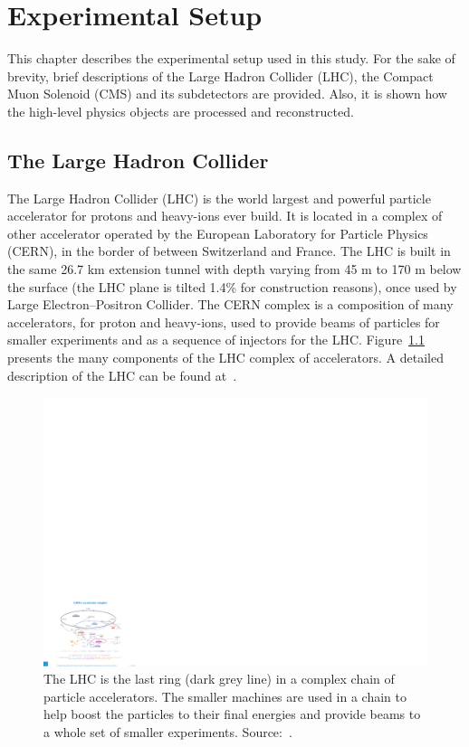 
\chapter{Experimental Setup}

This chapter describes the experimental setup used in this study.  For the sake of brevity, brief descriptions of the Large Hadron Collider (LHC), the Compact Muon Solenoid (CMS) and its  subdetectors are provided. Also, it is shown how  the high-level physics objects are processed and reconstructed.

\section{The Large Hadron Collider}

The Large Hadron Collider (LHC) is the world largest and powerful particle accelerator for protons and heavy-ions ever build. It is located in a complex of other accelerator operated by the European Laboratory for Particle Physics (CERN), in the border of between Switzerland and France. The LHC is built in the same 26.7 km extension tunnel with depth varying from 45 m to 170 m below the surface (the LHC plane is tilted 1.4\% for construction reasons), once used by Large Electron–Positron Collider. The CERN complex is a composition of many accelerators, for proton and heavy-ions, used to provide beams of particles for smaller experiments and as a sequence of injectors for the LHC. Figure~\ref{lhc_complex} presents the many components of the LHC complex of accelerators. A detailed description of the LHC can be found at~\cite{Evans:2008zzb, Bruning:782076, Bruning:815187, Benedikt:823808}.

\begin{figure}[htbp]
    \centering
    \includegraphics[width=\textwidth]{figures_and_tables/experimental_setup/lhc_complex.pdf}
    \caption{The LHC is the last ring (dark grey line) in a complex chain of particle accelerators. The smaller machines are used in a chain to help boost the particles to their final energies and provide beams to a whole set of smaller experiments. Source:~\cite{lhc_complex}.}
    \label{lhc_complex}
\end{figure}

